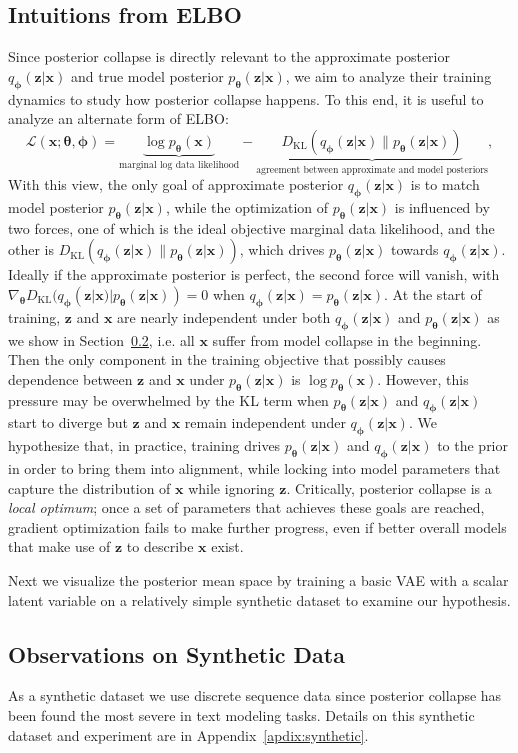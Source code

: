 \documentclass{article} \usepackage{iclr2019_conference,times}
\def\rvx{{\mathbf{x}}}
\def\rvz{{\mathbf{z}}}
\def\vtheta{{\bm{\theta}}}
\def\vphi{{\bm{\phi}}}
\newcommand{\Ls}{\mathcal{L}}
\newcommand{\KL}{D_{\mathrm{KL}}}
\newcommand{\qzx}{q_{\vphi}(\rvz|\rvx)}
\newcommand{\pzx}{p_{\vtheta}(\rvz|\rvx)}
\newcommand{\px}{p_{\vtheta}(\rvx)}
\newcommand{\z}{\rvz}
\newcommand{\x}{\rvx}
\newcommand{\dtheta}{\nabla_{\vtheta}}
\begin{document}
\subsection{Intuitions from ELBO}
Since posterior collapse is directly relevant to the approximate posterior $\qzx$ and true model posterior $\pzx$, we aim to analyze their training dynamics to study how posterior collapse happens. To this end, it is useful to analyze an alternate form of ELBO:
\begin{equation}
\label{eq:elbo-2}
\Ls (\rvx;\vtheta, \vphi) = \underbrace{\log \px}_{\textrm{marginal log data likelihood}} - \underbrace{\KL(\qzx \| \pzx)}_{\textrm{agreement between approximate and model posteriors}},
\end{equation}
With this view, the only goal of approximate posterior $\qzx$ is to match model posterior $\pzx$, while the optimization of $\pzx$ is influenced by two forces, one of which is the ideal objective marginal data likelihood, and the other is $\KL(\qzx \| \pzx)$, which drives $\pzx$ towards $\qzx$. Ideally if the approximate posterior is perfect, the second force will vanish, with $\dtheta\KL(\qzx | \pzx) = 0$ when $\qzx = \pzx$.
At the start of training, $\z$ and $\x$ are nearly independent under both $\qzx$ and $\pzx$ as we show in Section~\ref{sec:vanilla-syn}, i.e. all $\x$ suffer from model collapse in the beginning.
Then the only component in the training objective that possibly causes dependence between $\z$ and $\x$ under $\pzx$ is $\log \px$. However, this pressure may be overwhelmed by the KL term when $\pzx$ and $\qzx$ start to diverge but $\z$ and $\x$ remain independent under $\qzx$. We hypothesize that, in practice, training drives $\pzx$ and $\qzx$ to the prior in order to bring them into alignment, while locking into model parameters that capture the distribution of $\x$ while ignoring $\z$. Critically, posterior collapse is a \emph{local optimum}; once a set of parameters that achieves these goals are reached, gradient optimization fails to make further progress, even if better overall models that make use of $\z$ to describe $\x$ exist.

Next we visualize the posterior mean space by training a basic VAE with a scalar latent variable on a relatively simple synthetic dataset to examine our hypothesis.



\subsection{Observations on Synthetic Data}
\label{sec:vanilla-syn}
As a synthetic dataset we use discrete sequence data since posterior collapse has been found the most severe in text modeling tasks.
Details on this synthetic dataset and experiment are in Appendix~\ref{apdix:synthetic}.
\end{document}
